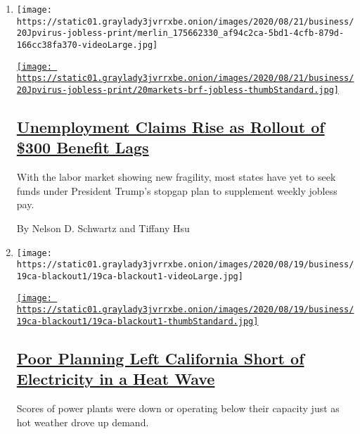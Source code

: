 \begin{enumerate}
\def\labelenumi{\arabic{enumi}.}
\item
  \texttt{[image: https://static01.graylady3jvrrxbe.onion/images/2020/08/21/business/20Jpvirus-jobless-print/merlin\_175662330\_af94c2ca-5bd1-4cfb-879d-166cc38fa370-videoLarge.jpg]}

  \href{/2020/08/20/business/economy/unemployment-claims.html}{\texttt{[image: https://static01.graylady3jvrrxbe.onion/images/2020/08/21/business/20Jpvirus-jobless-print/20markets-brf-jobless-thumbStandard.jpg]}}

  \hypertarget{unemployment-claims-rise-as-rollout-of-300-benefit-lags}{%
  \subsection{\texorpdfstring{\href{/2020/08/20/business/economy/unemployment-claims.html}{Unemployment
  Claims Rise as Rollout of \$300 Benefit
  Lags}}{Unemployment Claims Rise as Rollout of \$300 Benefit Lags}}\label{unemployment-claims-rise-as-rollout-of-300-benefit-lags}}

  With the labor market showing new fragility, most states have yet to
  seek funds under President Trump's stopgap plan to supplement weekly
  jobless pay.

  By Nelson D. Schwartz and Tiffany Hsu
\item
  \texttt{[image: https://static01.graylady3jvrrxbe.onion/images/2020/08/19/business/19ca-blackout1/19ca-blackout1-videoLarge.jpg]}

  \href{/2020/08/20/business/energy-environment/california-blackout-electric-grid.html}{\texttt{[image: https://static01.graylady3jvrrxbe.onion/images/2020/08/19/business/19ca-blackout1/19ca-blackout1-thumbStandard.jpg]}}

  \hypertarget{poor-planning-left-california-short-of-electricity-in-a-heat-wave}{%
  \subsection{\texorpdfstring{\href{/2020/08/20/business/energy-environment/california-blackout-electric-grid.html}{Poor
  Planning Left California Short of Electricity in a Heat
  Wave}}{Poor Planning Left California Short of Electricity in a Heat Wave}}\label{poor-planning-left-california-short-of-electricity-in-a-heat-wave}}

  Scores of power plants were down or operating below their capacity
  just as hot weather drove up demand.


\end{enumerate}
